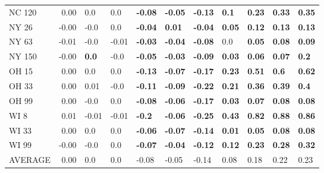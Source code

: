 \begin{tabular}{lrlllllllll}
NC 120  &     0.00 &             0.0 &            0.0 &  \textbf{-0.08} &  \textbf{-0.05} &  \textbf{-0.13} &    \textbf{0.1} &  \textbf{0.23} &   \textbf{0.33} &   \textbf{0.35} \\
NY 26   &    -0.00 &            -0.0 &            0.0 &  \textbf{-0.04} &   \textbf{0.01} &  \textbf{-0.04} &   \textbf{0.05} &  \textbf{0.12} &   \textbf{0.13} &   \textbf{0.13} \\
NY 63   &    -0.01 &            -0.0 &          -0.01 &  \textbf{-0.03} &  \textbf{-0.04} &  \textbf{-0.08} &             0.0 &  \textbf{0.05} &   \textbf{0.08} &   \textbf{0.09} \\
NY 150  &    -0.00 &    \textbf{0.0} &           -0.0 &  \textbf{-0.05} &  \textbf{-0.03} &  \textbf{-0.09} &   \textbf{0.03} &  \textbf{0.06} &   \textbf{0.07} &    \textbf{0.2} \\
OH 15   &     0.00 &             0.0 &            0.0 &  \textbf{-0.13} &  \textbf{-0.07} &  \textbf{-0.17} &   \textbf{0.23} &  \textbf{0.51} &    \textbf{0.6} &   \textbf{0.62} \\
OH 33   &     0.00 &            0.01 &           -0.0 &  \textbf{-0.11} &  \textbf{-0.09} &  \textbf{-0.22} &   \textbf{0.21} &  \textbf{0.36} &   \textbf{0.39} &    \textbf{0.4} \\
OH 99   &     0.00 &            -0.0 &            0.0 &  \textbf{-0.08} &  \textbf{-0.06} &  \textbf{-0.17} &   \textbf{0.03} &  \textbf{0.07} &   \textbf{0.08} &   \textbf{0.08} \\
WI 8    &     0.01 &           -0.01 &          -0.01 &   \textbf{-0.2} &  \textbf{-0.06} &  \textbf{-0.25} &   \textbf{0.43} &  \textbf{0.82} &   \textbf{0.88} &   \textbf{0.86} \\
WI 33   &     0.00 &             0.0 &            0.0 &  \textbf{-0.06} &  \textbf{-0.07} &  \textbf{-0.14} &   \textbf{0.01} &  \textbf{0.05} &   \textbf{0.08} &   \textbf{0.08} \\
WI 99   &    -0.00 &            -0.0 &            0.0 &  \textbf{-0.07} &  \textbf{-0.04} &  \textbf{-0.12} &   \textbf{0.12} &  \textbf{0.23} &   \textbf{0.28} &   \textbf{0.32} \\
AVERAGE &     0.00 &             0.0 &            0.0 &           -0.08 &           -0.05 &           -0.14 &            0.08 &           0.18 &            0.22 &            0.23 \\
\bottomrule
\end{tabular}
